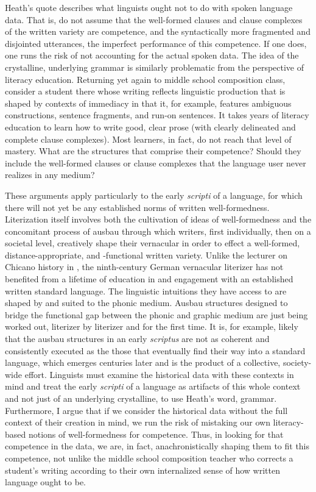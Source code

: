 \noindent Heath’s quote describes what linguists ought not to do with spoken language data. That is, do not assume that the well-formed clauses and clause complexes of the written variety are competence, and the syntactically more fragmented and disjointed utterances, the imperfect performance of this competence. If one does, one runs the risk of not accounting for the actual spoken data. The idea of the crystalline, underlying grammar is similarly problematic from the perspective of literacy education. Returning yet again to middle school composition class, consider a student there whose writing reflects linguistic production that is shaped by contexts of immediacy in that it, for example, features ambiguous constructions, sentence fragments, and run-on sentences. It takes years of literacy education to learn how to write good, clear prose (with clearly delineated and complete clause complexes). Most learners, in fact, do not reach that level of mastery. What are the structures that comprise their competence? Should they include the well-formed clauses or clause complexes that the language user never realizes in any medium?

These arguments apply particularly to the early \textit{scripti} of a language, for which there will not yet be any established norms of written well-formedness. Literization itself involves both the cultivation of ideas of well-formedness and the concomitant process of ausbau through which writers, first individually, then on a societal level, creatively shape their vernacular in order to effect a well-formed, distance-appropriate, and -functional written variety. Unlike the lecturer on Chicano history in , the ninth-century German vernacular literizer has not benefited from a lifetime of education in and engagement with an established written standard language. The linguistic intuitions they have access to are shaped by and suited to the phonic medium. Ausbau structures designed to bridge the functional gap between the phonic and graphic medium are just being worked out, literizer by literizer and for the first time. It is, for example, likely that the ausbau structures in an early \textit{scriptus} are not as coherent and consistently executed as the those that eventually find their way into a standard language, which emerges centuries later and is the product of a collective, society-wide effort. Linguists must examine the historical data with these contexts in mind and treat the early \textit{scripti} of a language as artifacts of this whole context and not just of an underlying crystalline, to use Heath’s word, grammar. Furthermore, I argue that if we consider the historical data without the full context of their creation in mind, we run the risk of mistaking our own literacy-based notions of well-formedness for competence. Thus, in looking for that competence in the data, we are, in fact, anachronistically shaping them to fit this competence, not unlike the middle school composition teacher who corrects a student’s writing according to their own internalized sense of how written language ought to be.

